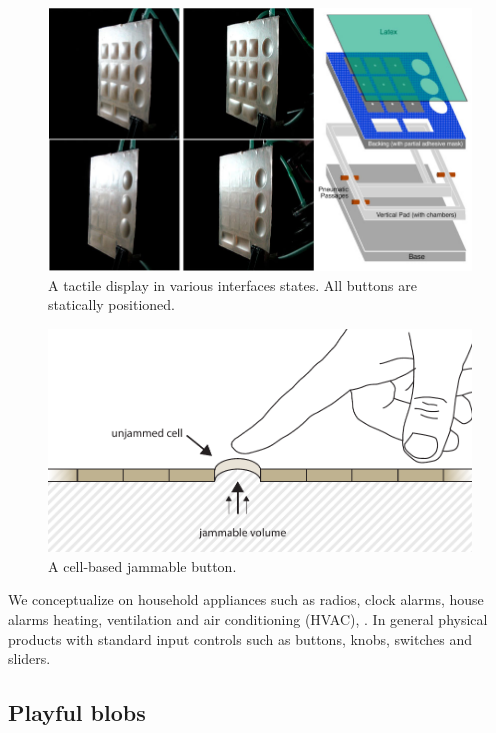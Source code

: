\begin{figure}[h]
  \centering
      \includegraphics[width=.9\textwidth]{figures/jamming/concepts/harrisonhudson}
  \caption[A tactile display in various interfaces states. All buttons are statically positioned.]
  {A tactile display in various interfaces states. All buttons are statically positioned.}
  \label{fig:ch:jamming:concepts:harrisonhudson}
\end{figure}

\begin{figure}[h]
  \centering
      \includegraphics[width=.9\textwidth]{figures/jamming/concepts/jamming_button}
  \caption[A cell-based jammable button.]
  {A cell-based jammable button.}
  \label{fig:ch:jamming:concepts:button}
\end{figure}

We conceptualize on household appliances such as radios, clock alarms, house alarms heating, ventilation and air conditioning (HVAC), .
In general physical products with standard input controls such as buttons, knobs, switches and sliders.

\subsection{Playful blobs}
\label{ch:jamming:concepts:playful_blobs}

